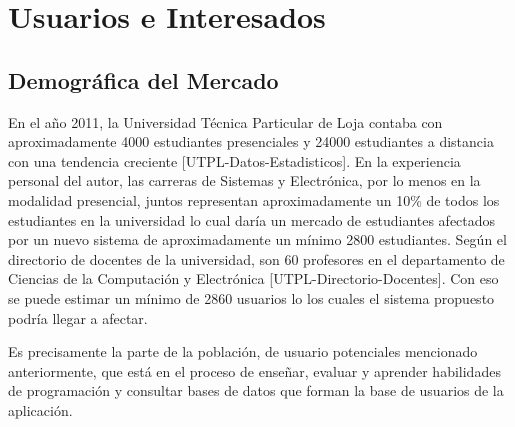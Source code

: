 \pagebreak

\section{Usuarios e Interesados}
\subsection{Demográfica del Mercado}
En el año 2011, la Universidad Técnica Particular de Loja contaba con aproximadamente 4000 estudiantes presenciales y 24000 estudiantes a distancia con una tendencia creciente [UTPL-Datos-Estadisticos]. En la experiencia personal del autor, las carreras de Sistemas y Electrónica, por lo menos en la modalidad presencial, juntos representan aproximadamente un 10\% de todos los estudiantes en la universidad lo cual daría un mercado de estudiantes afectados por un nuevo sistema de aproximadamente un mínimo 2800 estudiantes. Según el directorio de docentes de la universidad, son 60 profesores en el departamento de Ciencias de la Computación y Electrónica [UTPL-Directorio-Docentes]. Con eso se puede estimar un mínimo de 2860 usuarios lo los cuales el sistema propuesto podría llegar a afectar.

Es precisamente la parte de la población, de usuario potenciales mencionado anteriormente, que está en el proceso de enseñar, evaluar y aprender habilidades de programación y consultar bases de datos que forman la base de usuarios de la aplicación.

